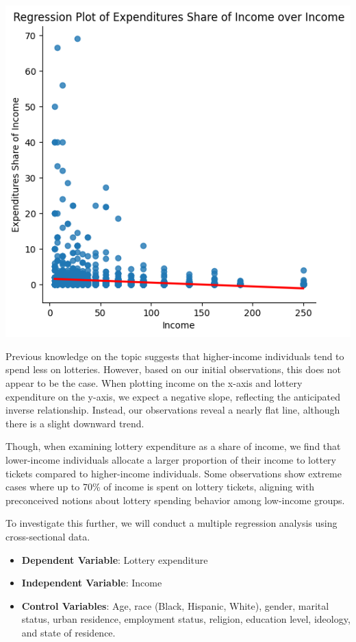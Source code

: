 \documentclass[
  12pt]{article}
\providecommand{\tightlist}{%
  \setlength{\itemsep}{0pt}\setlength{\parskip}{0pt}}\usepackage{longtable,booktabs,array}
\begin{document}
\includegraphics{images/19.png}

Previous knowledge on the topic suggests that higher-income individuals
tend to spend less on lotteries. However, based on our initial
observations, this does not appear to be the case. When plotting income
on the x-axis and lottery expenditure on the y-axis, we expect a
negative slope, reflecting the anticipated inverse relationship.
Instead, our observations reveal a nearly flat line, although there is a
slight downward trend.

Though, when examining lottery expenditure as a share of income, we find
that lower-income individuals allocate a larger proportion of their
income to lottery tickets compared to higher-income individuals. Some
observations show extreme cases where up to 70\% of income is spent on
lottery tickets, aligning with preconceived notions about lottery
spending behavior among low-income groups.

To investigate this further, we will conduct a multiple regression
analysis using cross-sectional data.

\begin{itemize}
\tightlist
\item
  \textbf{Dependent Variable}: Lottery expenditure\\
\item
  \textbf{Independent Variable}: Income\\
\item
  \textbf{Control Variables}: Age, race (Black, Hispanic, White),
  gender, marital status, urban residence, employment status, religion,
  education level, ideology, and state of residence.
\end{itemize}
\end{document}
